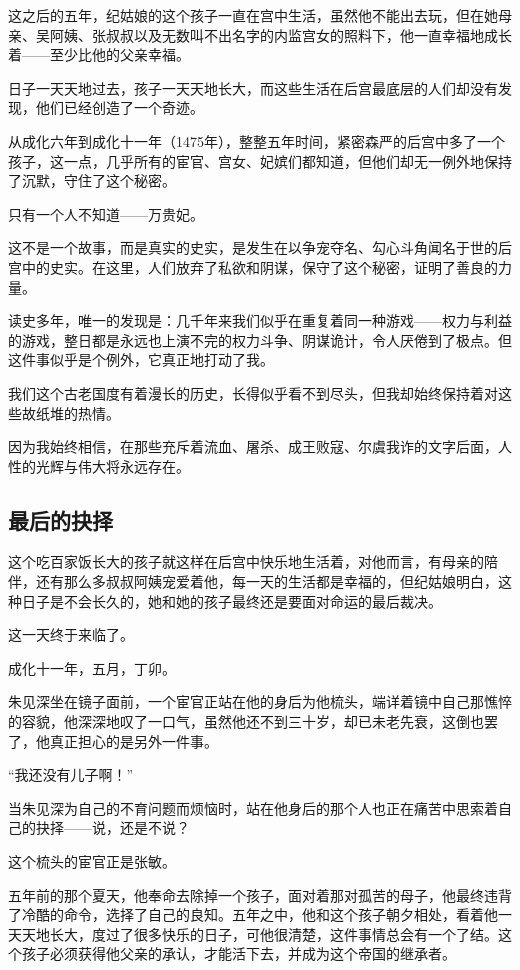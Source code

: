 \begin{multicols}{\theparacolNo}
		这之后的五年，纪姑娘的这个孩子一直在宫中生活，虽然他不能出去玩，但在她母亲、吴阿姨、张叔叔以及无数叫不出名字的内监宫女的照料下，他一直幸福地成长着——至少比他的父亲幸福。

		日子一天天地过去，孩子一天天地长大，而这些生活在后宫最底层的人们却没有发现，他们已经创造了一个奇迹。

		从成化六年到成化十一年（1475年），整整五年时间，紧密森严的后宫中多了一个孩子，这一点，几乎所有的宦官、宫女、妃嫔们都知道，但他们却无一例外地保持了沉默，守住了这个秘密。

		只有一个人不知道——万贵妃。

		这不是一个故事，而是真实的史实，是发生在以争宠夺名、勾心斗角闻名于世的后宫中的史实。在这里，人们放弃了私欲和阴谋，保守了这个秘密，证明了善良的力量。

		读史多年，唯一的发现是：几千年来我们似乎在重复着同一种游戏——权力与利益的游戏，整日都是永远也上演不完的权力斗争、阴谋诡计，令人厌倦到了极点。但这件事似乎是个例外，它真正地打动了我。

		我们这个古老国度有着漫长的历史，长得似乎看不到尽头，但我却始终保持着对这些故纸堆的热情。

		因为我始终相信，在那些充斥着流血、屠杀、成王败寇、尔虞我诈的文字后面，人性的光辉与伟大将永远存在。

		\subsection{最后的抉择}
		这个吃百家饭长大的孩子就这样在后宫中快乐地生活着，对他而言，有母亲的陪伴，还有那么多叔叔阿姨宠爱着他，每一天的生活都是幸福的，但纪姑娘明白，这种日子是不会长久的，她和她的孩子最终还是要面对命运的最后裁决。

		这一天终于来临了。

		成化十一年，五月，丁卯。

		朱见深坐在镜子面前，一个宦官正站在他的身后为他梳头，端详着镜中自己那憔悴的容貌，他深深地叹了一口气，虽然他还不到三十岁，却已未老先衰，这倒也罢了，他真正担心的是另外一件事。

		“我还没有儿子啊！”

		当朱见深为自己的不育问题而烦恼时，站在他身后的那个人也正在痛苦中思索着自己的抉择——说，还是不说？

		这个梳头的宦官正是张敏。

		五年前的那个夏天，他奉命去除掉一个孩子，面对着那对孤苦的母子，他最终违背了冷酷的命令，选择了自己的良知。五年之中，他和这个孩子朝夕相处，看着他一天天地长大，度过了很多快乐的日子，可他很清楚，这件事情总会有一个了结。这个孩子必须获得他父亲的承认，才能活下去，并成为这个帝国的继承者。


\end{multicols}
